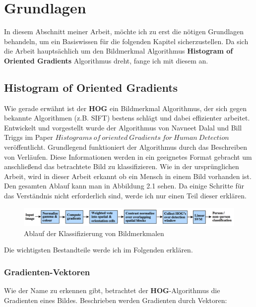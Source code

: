 \chapter{Grundlagen}
\label{chap:grundlagen}

In diesem Abschnitt meiner Arbeit, möchte ich zu erst die nötigen Grundlagen behandeln, um ein Basiswissen für die folgenden Kapitel sicherzustellen.
Da sich die Arbeit hauptsächlich um den Bildmerkmal Algorithmus \textbf{Histogram of Oriented Gradients} Algorithmus dreht, fange ich mit diesem an.
\section{Histogram of Oriented Gradients}
\label{sec:grundlagenhog}
Wie gerade erwähnt ist der \textbf{HOG} ein Bildmerkmal Algorithmus, der sich gegen bekannte Algorithmen (z.B. SIFT) bestens schlägt und dabei  effizienter arbeitet. Entwickelt und vorgestellt wurde der Algorithmus von Navneet Dalal und Bill Triggs im Paper $Histograms~of ~oriented~Gradients~for~Human~Detection$ \cite{dalal:inria-00548512} veröffentlicht.
Grundlegend funktioniert der Algorithmus durch das Beschreiben von Verläufen. Diese Informationen werden in ein geeignetes Format gebracht um anschließend das betrachtete Bild zu klassifizieren. Wie in der ursprünglichen Arbeit, wird in dieser Arbeit erkannt ob ein Mensch in  einem Bild vorhanden ist.
Den gesamten Ablauf kann man in Abbildung 2.1 sehen. Da einige Schritte für das Verständnis nicht erforderlich sind, werde ich nur einen Teil dieser erklären.

\begin{figure}[htbp]\centering 
	\includegraphics[width=1\linewidth]{pics/feature extraction chain.png} 
	\caption{Ablauf der Klassifizierung von Bildmerkmalen
	\cite{dalal:inria-00548512}}\label{fig:grundlagen_feature_extraction_chain}\end{figure}

Die wichtigsten Bestandteile werde ich im Folgenden erklären.

\subsection{Gradienten-Vektoren}

Wie der Name zu erkennen gibt, betrachtet der \textbf{HOG}-Algorithmus die Gradienten eines Bildes. Beschrieben werden Gradienten durch Vektoren:

